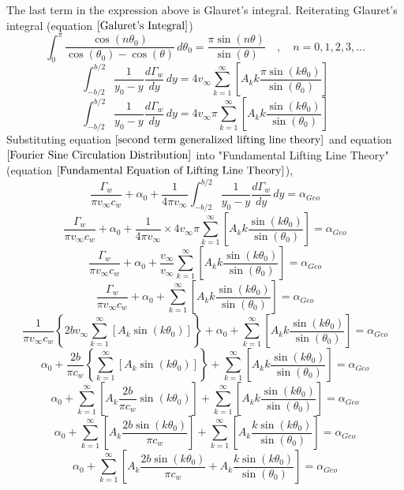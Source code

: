 \documentclass[a4paper, 12pt]{report}
\begin{document}
\begin{center}
The last term in the expression above is Glauret's integral. Reiterating Glauret's integral (equation $\ref{Galuret's Integral}$)
$$\int^{\pi}_{0} \frac{\cos(n\theta_{0})}{\cos(\theta_{0}) - \cos(\theta)} \,d\theta_{0} = \frac{\pi \sin(n\theta)}{\sin(\theta)} \quad,\quad n = 0,1,2,3,\dots$$
$$\int^{b/2}_{-b/2}\frac{1}{y_{0}-y}\frac{d\Gamma_{w}}{d y}\,dy =  4v_{\infty}\sum^{\infty}_{k = 1}\left[A_{k}k \frac{\pi \sin(k\theta_{0})}{\sin(\theta_{0})}\right] $$
\begin{equation}
\int^{b/2}_{-b/2}\frac{1}{y_{0}-y}\frac{d\Gamma_{w}}{d y}\,dy =  4v_{\infty}\pi\sum^{\infty}_{k = 1}\left[A_{k}k\frac{\sin(k\theta_{0})}{\sin(\theta_{0})}\right] 
\label{second term generalized lifting line theory}
\end{equation}
Substituting equation $\ref{second term generalized lifting line theory}$ and equation $\ref{Fourier Sine Circulation Distribution}$ into "Fundamental Lifting Line Theory" (equation $\ref{Fundamental Equation of Lifting Line Theory}$),
$$\frac{\Gamma_{w}}{\pi v_{\infty}c_{w}} + \alpha_{0} + \frac{1}{4\pi v_{\infty}} \int^{b/2}_{-b/2}\frac{1}{y_{0}-y}\frac{d\Gamma_{w}}{dy} \,dy = \alpha_{Geo}$$
$$\frac{\Gamma_{w}}{\pi v_{\infty}c_{w}} + \alpha_{0} + \frac{1}{4\pi v_{\infty}}\times 4v_{\infty}\pi\sum^{\infty}_{k = 1}\left[A_{k}k\frac{\sin(k\theta_{0})}{\sin(\theta_{0})}\right] = \alpha_{Geo}$$
$$\frac{\Gamma_{w}}{\pi v_{\infty}c_{w}} + \alpha_{0} + \frac{v_{\infty}}{ v_{\infty}} \sum^{\infty}_{k = 1}\left[A_{k}k\frac{\sin(k\theta_{0})}{\sin(\theta_{0})}\right] = \alpha_{Geo}$$
$$\frac{\Gamma_{w}}{\pi v_{\infty}c_{w}} + \alpha_{0} + \sum^{\infty}_{k = 1}\left[A_{k}k\frac{\sin(k\theta_{0})}{\sin(\theta_{0})}\right] = \alpha_{Geo}$$
$$\frac{1}{\pi v_{\infty}c_{w}}\left\{2bv_{\infty}\sum^{\infty}_{k = 1}\left[A_{k}\sin(k\theta_{0})\right]\right\} + \alpha_{0} + \sum^{\infty}_{k = 1}\left[A_{k}k\frac{\sin(k\theta_{0})}{\sin(\theta_{0})}\right] = \alpha_{Geo}$$
$$\alpha_{0} + \frac{2b}{\pi c_{w}}\left\{\sum^{\infty}_{k = 1}\left[A_{k}\sin(k\theta_{0})\right]\right\} + \sum^{\infty}_{k = 1}\left[A_{k}k\frac{\sin(k\theta_{0})}{\sin(\theta_{0})}\right] = \alpha_{Geo}$$
$$\alpha_{0} + \sum^{\infty}_{k = 1}\left[A_{k}\frac{2b}{\pi c_{w}}\sin(k\theta_{0})\right] + \sum^{\infty}_{k = 1}\left[A_{k}k\frac{\sin(k\theta_{0})}{\sin(\theta_{0})}\right] = \alpha_{Geo}$$
$$\alpha_{0} + \sum^{\infty}_{k = 1}\left[A_{k}\frac{2b\sin(k\theta_{0})}{\pi c_{w}}\right] + \sum^{\infty}_{k = 1}\left[A_{k}\frac{k\sin(k\theta_{0})}{\sin(\theta_{0})}\right] = \alpha_{Geo}$$
$$\alpha_{0} + \sum^{\infty}_{k = 1}\left[A_{k}\frac{2b\sin(k\theta_{0})}{\pi c_{w}} + A_{k}\frac{k\sin(k\theta_{0})}{\sin(\theta_{0})}\right] = \alpha_{Geo}$$

\end{center}
\end{document}
